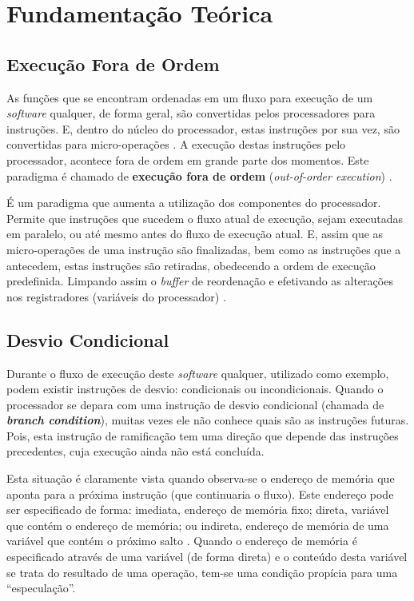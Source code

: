 \documentclass[conference]{IEEEtran}
\begin{document}
\section{Fundamentação Teórica}
\subsection{Execução Fora de Ordem}
As funções que se encontram ordenadas em um fluxo para execução de um \emph{software} qualquer, de forma geral, são convertidas pelos processadores para instruções. E, dentro do núcleo do processador, estas instruções por sua vez, são convertidas para micro-operações \cite{Alisson2017Introducao}. A execução destas instruções pelo processador, acontece fora de ordem em grande parte dos momentos. Este paradigma é chamado de \textbf{execução fora de ordem} (\emph{out-of-order execution}) \cite{Fog2017Microarchitecture}.

É um paradigma que aumenta a utilização dos componentes do processador. Permite que instruções que sucedem o fluxo atual de execução, sejam executadas em paralelo, ou até mesmo antes do fluxo de execução atual. E, assim que as micro-operações de uma instrução são finalizadas, bem como as instruções que a antecedem, estas instruções são retiradas, obedecendo a ordem de execução predefinida. Limpando assim o \emph{buffer} de reordenação e efetivando as alterações nos registradores (variáveis do processador) \cite{Kocher2018Spectre}.

\subsection{Desvio Condicional}
Durante o fluxo de execução deste \emph{software} qualquer, utilizado como exemplo, podem existir instruções de desvio: condicionais ou incondicionais. Quando o processador se depara com uma instrução de desvio condicional (chamada de \textbf{\emph{branch condition}}), muitas vezes ele não conhece quais são as instruções futuras. Pois, esta instrução de ramificação tem uma direção que depende das instruções precedentes, cuja execução ainda não está concluída. 

Esta situação é claramente vista quando observa-se o endereço de memória que aponta para a próxima instrução (que continuaria o fluxo). Este endereço pode ser especificado de forma: imediata, endereço de memória fixo; direta, variável que contém o endereço de memória; ou indireta, endereço de memória de uma variável que contém o próximo salto \cite{Debarshi2018Addressing}. Quando o endereço de memória é especificado através de uma variável (de forma direta) e o conteúdo desta variável se trata do resultado de uma operação, tem-se uma condição propícia para uma ``especulação''.
\end{document}
